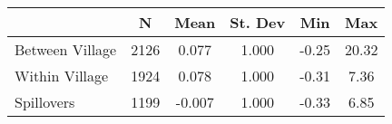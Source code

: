\begin{tabular}{l*{5}{c}}\hline&\multicolumn{1}{c}{N}&\multicolumn{1}{c}{Mean}&\multicolumn{1}{c}{St. Dev}&\multicolumn{1}{c}{Min}&\multicolumn{1}{c}{Max}\\ \hline 
Between Village & 2126 & 0.077 & 1.000 & -0.25 & 20.32 \\
Within Village & 1924 & 0.078 & 1.000 & -0.31 & 7.36 \\
Spillovers & 1199 & -0.007 & 1.000 & -0.33 & 6.85 \\
\hline \end{tabular}
